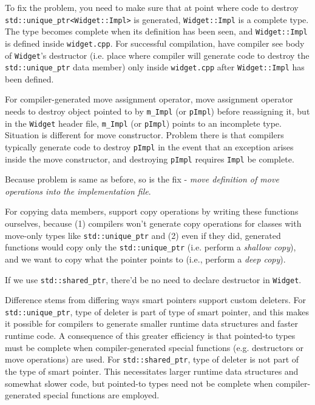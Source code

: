 \documentclass[10pt]{amsart}
\begin{document}
\begin{multicols*}{2}
To fix the problem, you need to make sure that at point where code to destroy \verb|std::unique_ptr<Widget::Impl>| is generated, \verb|Widget::Impl| is a complete type.  The type becomes complete when its definition has been seen, and \verb|Widget::Impl| is defined inside \verb|widget.cpp|.  For successful compilation, have compiler see body of \verb|Widget|'s destructor (i.e. place where compiler will generate code to destroy the \verb|std::unique_ptr| data member) only inside \verb|widget.cpp| after \verb|Widget::Impl| has been defined.  

For compiler-generated move assignment operator, move assignment operator needs to destroy object pointed to by \verb|m_Impl| (or \verb|pImpl|) before reassigning it, but in the \verb|Widget| header file, \verb|m_Impl| (or \verb|pImpl|) points to an incomplete type.  Situation is different for move constructor.  Problem there is that compilers typically generate code to destroy \verb|pImpl| in the event that an exception arises inside the move constructor, and destroying \verb|pImpl| requires \verb|Impl| be complete.  

Because problem is same as before, so is the fix - \emph{move definition of move operations into the implementation file}.  

For copying data members, support copy operations by writing these functions ourselves, because (1) compilers won't generate copy operations for classes with move-only types like \verb|std::unique_ptr| and (2) even if they did, generated functions would copy only the \verb|std::unique_ptr| (i.e. perform a \emph{shallow copy}), and we want to copy what the pointer points to (i.e., perform a \emph{deep copy}).  

If we use \verb|std::shared_ptr|, there'd be no need to declare destructor in \verb|Widget|.  

Difference stems from differing ways smart pointers support custom deleters.  For \verb|std::unique_ptr|, type of deleter is part of type of smart pointer, and this makes it possible for compilers to generate smaller runtime data structures and faster runtime code.  A consequence of this greater efficiency is that pointed-to types must be complete when compiler-generated special functions (e.g. destructors or move operations) are used.  For \verb|std::shared_ptr|, type of deleter is not part of the type of smart pointer.  This necessitates larger runtime data structures and somewhat slower code, but pointed-to types need not be complete when compiler-generated special functions are employed.  


\end{multicols*}
\end{document}
